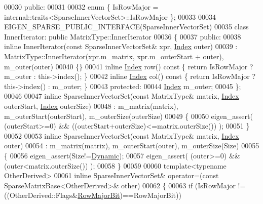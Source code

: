 \begin{DoxyCode}
00030   \textcolor{keyword}{public}:
00031 
00032     \textcolor{keyword}{enum} \{ IsRowMajor = internal::traits<SparseInnerVectorSet>::IsRowMajor \};
00033 
00034     EIGEN\_SPARSE\_PUBLIC\_INTERFACE(SparseInnerVectorSet)
00035     \textcolor{keyword}{class }InnerIterator: \textcolor{keyword}{public} MatrixType::InnerIterator
00036     \{
00037       \textcolor{keyword}{public}:
00038         \textcolor{keyword}{inline} InnerIterator(\textcolor{keyword}{const} SparseInnerVectorSet& xpr, \hyperlink{namespace_eigen_a62e77e0933482dafde8fe197d9a2cfde}{Index} outer)
00039           : MatrixType::InnerIterator(xpr.m\_matrix, xpr.m\_outerStart + outer), m\_outer(outer)
00040         \{\}
00041         \textcolor{keyword}{inline} \hyperlink{namespace_eigen_a62e77e0933482dafde8fe197d9a2cfde}{Index} row()\textcolor{keyword}{ const }\{ \textcolor{keywordflow}{return} IsRowMajor ? m\_outer : this->index(); \}
00042         \textcolor{keyword}{inline} \hyperlink{namespace_eigen_a62e77e0933482dafde8fe197d9a2cfde}{Index} col()\textcolor{keyword}{ const }\{ \textcolor{keywordflow}{return} IsRowMajor ? this->index() : m\_outer; \}
00043       \textcolor{keyword}{protected}:
00044         \hyperlink{namespace_eigen_a62e77e0933482dafde8fe197d9a2cfde}{Index} m\_outer;
00045     \};
00046 
00047     \textcolor{keyword}{inline} SparseInnerVectorSet(\textcolor{keyword}{const} MatrixType& matrix, \hyperlink{namespace_eigen_a62e77e0933482dafde8fe197d9a2cfde}{Index} outerStart, 
      \hyperlink{namespace_eigen_a62e77e0933482dafde8fe197d9a2cfde}{Index} outerSize)
00048       : m\_matrix(matrix), m\_outerStart(outerStart), m\_outerSize(outerSize)
00049     \{
00050       eigen\_assert( (outerStart>=0) && ((outerStart+outerSize)<=matrix.outerSize()) );
00051     \}
00052 
00053     \textcolor{keyword}{inline} SparseInnerVectorSet(\textcolor{keyword}{const} MatrixType& matrix, \hyperlink{namespace_eigen_a62e77e0933482dafde8fe197d9a2cfde}{Index} outer)
00054       : m\_matrix(matrix), m\_outerStart(outer), m\_outerSize(Size)
00055     \{
00056       eigen\_assert(Size!=\hyperlink{namespace_eigen_ad81fa7195215a0ce30017dfac309f0b2}{Dynamic});
00057       eigen\_assert( (outer>=0) && (outer<matrix.outerSize()) );
00058     \}
00059 
00060     \textcolor{keyword}{template}<\textcolor{keyword}{typename} OtherDerived>
00061     \textcolor{keyword}{inline} SparseInnerVectorSet& operator=(\textcolor{keyword}{const} SparseMatrixBase<OtherDerived>& other)
00062     \{
00063       \textcolor{keywordflow}{if} (IsRowMajor != ((OtherDerived::Flags&\hyperlink{group__flags_gae4f56c2a60bbe4bd2e44c5b19cbe8762}{RowMajorBit})==RowMajorBit))

\end{DoxyCode}
